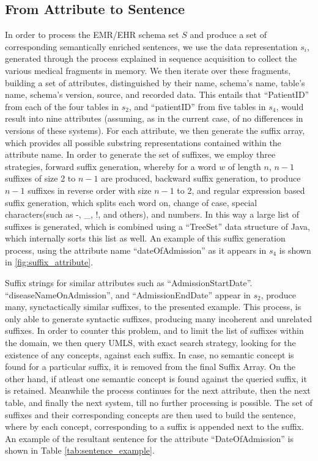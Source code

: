 \documentclass{ieeeaccess}
\begin{document}
\subsection{From Attribute to Sentence}
\label{schema_prepro}
In order to process the EMR/EHR schema set $S$ and produce a set of corresponding semantically enriched sentences, we use the data representation $s_i$, generated through the process explained in sequence acquisition to collect the various medical fragments in memory. We then iterate over these fragments, building a set of attributes, distinguished by their name, schema's name, table's name, schema's version, source, and recorded data. This entails that ``PatientID'' from each of the four tables in $s_2$, and ``patientID'' from five tables in $s_4$, would result into nine attributes (assuming, as in the current case, of no differences in versions of these systems).
For each attribute, we then generate the suffix array, which provides all possible substring representations contained within the attribute name. In order to generate the set of suffixes, we employ three strategies, forward suffix generation, whereby for a word $w$ of length $n$, $n-1$ suffixes of size 2 to $n-1$ are produced, backward suffix generation, to produce $n-1$ suffixes in reverse order with size $n-1$ to 2, and regular expression based suffix generation, which splits each word on, change of case, special characters(such as -, \_, !, and others), and numbers. In this way a large list of suffixes is generated, which is combined using a ``TreeSet'' data structure of Java, which internally sorts this list as well. An example of this suffix generation process, using the attribute name ``dateOfAdmission'' as it appears in $s_4$ is shown in \ref{fig:suffix_attribute}.

Suffix strings for similar attributes such as ``AdmissionStartDate''. ``diseaseNameOnAdmission'', and ``AdmissionEndDate'' appear in $s_2$, produce many, synctactically similar suffixes, to the presented example. This process, is only able to generate syntactic suffixes, producing many incoherent and unrelated suffixes. In order to counter this problem, and to limit the list of suffixes within the domain, we then query UMLS, with exact search strategy, looking for the existence of any concepts, against each suffix. In case, no semantic concept is found for a particular suffix, it is removed from the final Suffix Array. On the other hand, if atleast one semantic concept is found against the queried suffix, it is retained. Meanwhile the process continues for the next attribute, then the next table, and finally the next system, till no further processing is possible. 
The set of suffixes and their corresponding concepts are then used to build the sentence, where by each concept, corresponding to a suffix is appended next to the suffix. An example of the resultant sentence for the attribute ``DateOfAdmission'' is shown in Table \ref{tab:sentence_example}.
\end{document}
